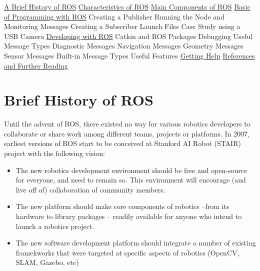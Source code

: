 \documentclass[twoside]{article}
\begin{document}
\begin{outline}
    \footnotesize
    \1 \hyperref[sec:history]{A Brief History of ROS}%
    \1 \hyperref[sec:characteristics]{Characteristics of ROS}%
    \1 \hyperref[sec:maincomponent]{Main Components of ROS}%
    \1 \hyperref[sec:programming]{Basic of Programming with ROS}%
    \2 Creating a Publisher
    \2 Running the Node and Monitoring Messages
    \2 Creating a Subscriber
    \2 Launch Files
    \2 Case Study using a USB Camera
    \1 \hyperref[sec:development]{Developing with ROS}%
    \2 Catkin and ROS Packages
    \2 Debugging
    \2 Useful Message Types
    \3 Diagnostic Messages
    \3 Navigation Messages
    \3 Geometry Messages
    \3 Sensor Messages
    \3 Built-in Message Types
    \2 Useful Features
    \1 \hyperref[sec:help]{Getting Help}
    \1 \hyperref[sec:bib]{References and Further Reading}
\end{outline}


\section{Brief History of ROS}\label{history}\label{sec:history}
Until the advent of ROS, there existed no way for various robotics developers to collaborate or share work among different teams, projects or platforms. In 2007, earliest versions of ROS start to be conceived at Stanford AI Robot (STAIR) project with the following vision:

\begin{itemize}
    \item The new robotics development environment should be free and open-source for everyone, and need to remain so. This environment will encourage (and live off of) collaboration of community members.
    \item The new platform should make core components of robotics --from its hardware to library packages  -- readily available for anyone who intend to launch a robotics project.
    \item The new software development platform should integrate a number of existing framekworks that were targeted at specific aspects of robotics (OpenCV, SLAM, Gazebo, etc)
\end{itemize}
\end{document}
